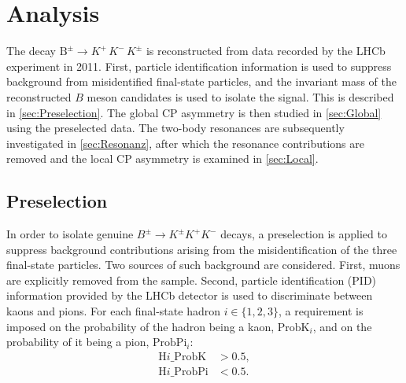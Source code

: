 \section{Analysis}
\label{sec:Analysis}
The decay $\text{B}^{\pm} \to K^{+} \, K^{-} \, K^{\pm}$ is reconstructed from data recorded by the LHCb experiment in 2011.
First,
particle identification information is used to suppress background
from misidentified final-state particles, and the invariant mass of the
reconstructed $B$ meson candidates is used to isolate the signal.
This is described in \autoref{sec:Preselection}.
The global CP asymmetry is then studied in \autoref{sec:Global} using the preselected data.
The two-body resonances are subsequently investigated in \autoref{sec:Resonanz},
after which the resonance contributions are removed and the local CP asymmetry is examined in \autoref{sec:Local}.

\subsection{Preselection}
\label{sec:Preselection}
In order to isolate genuine $B^{\pm} \rightarrow K^{\pm}K^{+}K^{-}$ decays,
a preselection is applied to suppress background contributions arising from the misidentification of the three final-state particles.
Two sources of such background are considered.
First,
muons are explicitly removed from the sample.
Second, particle identification (PID) information provided by the LHCb
detector is used to discriminate between kaons and pions.
For each final-state hadron $i \in \{1,2,3\}$,
a requirement is imposed on the probability of the
hadron being a kaon,
$\mathrm{ProbK}_i$,
and on the probability of it being a
pion,
$\mathrm{ProbPi}_i$:
\begin{align}
    \mathrm{H}i\_\mathrm{ProbK} &> 0.5, \\
    \mathrm{H}i\_\mathrm{ProbPi} &< 0.5.
\end{align}

